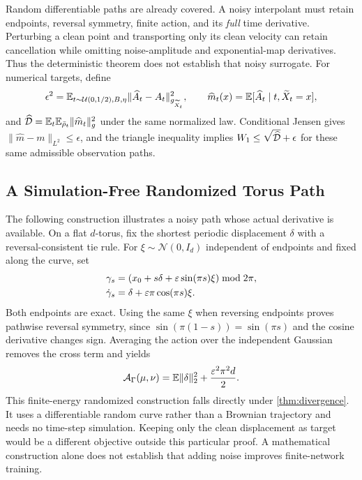 Random differentiable paths are already covered. A noisy interpolant must retain endpoints, reversal symmetry, finite action, and its \emph{full} time derivative. Perturbing a clean point and transporting only its clean velocity can retain cancellation while omitting noise-amplitude and exponential-map derivatives. Thus the deterministic theorem does not establish that noisy surrogate. For numerical targets, define
\begin{equation}
\epsilon^2=\E_{t\sim\mathcal U(0,1/2),B,\eta}\norm{g_{\widetilde X_t}}{\widehat A_t-A_t}^2,
\qquad \widehat m_t(x)=\E[\widehat A_t\mid t,\widetilde X_t=x],
\end{equation}
and $\widehat\D=\E_t\E_{\bar\rho_t}\|\widehat m_t\|_g^2$ under the same normalized law. Conditional Jensen gives $\|\widehat m-m\|_{L^2}\leq\epsilon$, and the triangle inequality implies $W_1\leq\sqrt{\widehat\D}+\epsilon$ for these same admissible observation paths.

\subsection{A Simulation-Free Randomized Torus Path}
\label{app:noisy-torus}
The following construction illustrates a noisy path whose actual derivative is available. On a flat $d$-torus, fix the shortest periodic displacement $\delta$ with a reversal-consistent tie rule. For $\xi\sim\mathcal N(0,I_d)$ independent of endpoints and fixed along the curve, set
\begin{align}
\gamma_s&=(x_0+s\delta+\varepsilon\sin(\pi s)\xi)\bmod2\pi,\notag\\
\dot\gamma_s&=\delta+\varepsilon\pi\cos(\pi s)\xi.
\label{eq:noisy-torus}
\end{align}
Both endpoints are exact. Using the same $\xi$ when reversing endpoints proves pathwise reversal symmetry, since $\sin(\pi(1-s))=\sin(\pi s)$ and the cosine derivative changes sign. Averaging the action over the independent Gaussian removes the cross term and yields
\begin{equation}
\mathcal A_\Gamma(\mu,\nu)=\E\|\delta\|_2^2+\frac{\varepsilon^2\pi^2d}{2}.
\end{equation}
This finite-energy randomized construction falls directly under \cref{thm:divergence}. It uses a differentiable random curve rather than a Brownian trajectory and needs no time-step simulation. Keeping only the clean displacement as target would be a different objective outside this particular proof. A mathematical construction alone does not establish that adding noise improves finite-network training.

